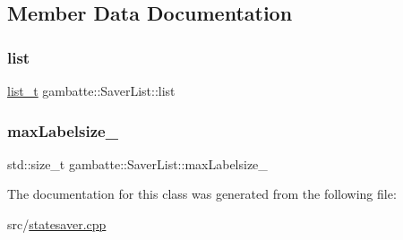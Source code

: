 \subsection{Member Data Documentation}
\mbox{\label{classgambatte_1_1SaverList_af9e4e053e36847ef9e87441900135c09}} 
\subsubsection{\texorpdfstring{list}{list}}
{\footnotesize\ttfamily \hyperlink{classgambatte_1_1SaverList_aa91497bbdb2dbc6c3f44a45e26a9f835}{list\+\_\+t} gambatte\+::\+Saver\+List\+::list\hspace{0.3cm}{\ttfamily [private]}}

\mbox{\label{classgambatte_1_1SaverList_a5909f25db602678444f8344826bf7628}} 
\subsubsection{\texorpdfstring{max\+Labelsize\+\_\+}{maxLabelsize\_}}
{\footnotesize\ttfamily std\+::size\+\_\+t gambatte\+::\+Saver\+List\+::max\+Labelsize\+\_\+\hspace{0.3cm}{\ttfamily [private]}}



The documentation for this class was generated from the following file\+:\begin{DoxyCompactItemize}
\item 
src/\hyperlink{statesaver_8cpp}{statesaver.\+cpp}\end{DoxyCompactItemize}
